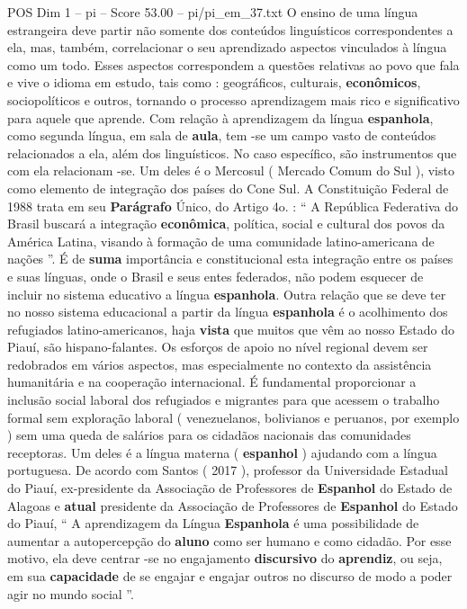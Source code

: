 \begin{textsample}{POS Dim 1 – pi – Score 53.00 – pi/pi\_em\_37.txt}
O ensino de uma língua estrangeira deve partir não somente dos conteúdos linguísticos correspondentes a ela, mas, também, correlacionar o seu aprendizado aspectos vinculados à língua como um todo.
Esses aspectos correspondem a questões relativas ao povo que fala e vive o idioma em estudo, tais como : geográficos, culturais, \textbf{econômicos}, sociopolíticos e outros, tornando o processo aprendizagem mais rico e significativo para aquele que aprende.
Com relação à aprendizagem da língua \textbf{espanhola}, como segunda língua, em sala de \textbf{aula}, tem -se um campo vasto de conteúdos relacionados a ela, além dos linguísticos.
No caso específico, são instrumentos que com ela relacionam -se.
Um deles é o Mercosul ( Mercado Comum do Sul ), visto como elemento de integração dos países do Cone Sul.
A Constituição Federal de 1988 trata em seu \textbf{Parágrafo} Único, do Artigo 4o. : “ A República Federativa do Brasil buscará a integração \textbf{econômica}, política, social e cultural dos povos da América Latina, visando à formação de uma comunidade latino-americana de nações ”.
É de \textbf{suma} importância e constitucional esta integração entre os países e suas línguas, onde o Brasil e seus entes federados, não podem esquecer de incluir no sistema educativo a língua \textbf{espanhola}.
Outra relação que se deve ter no nosso sistema educacional a partir da língua \textbf{espanhola} é o acolhimento dos refugiados latino-americanos, haja \textbf{vista} que muitos que vêm ao nosso Estado do Piauí, são hispano-falantes.
Os esforços de apoio no nível regional devem ser redobrados em vários aspectos, mas especialmente no contexto da assistência humanitária e na cooperação internacional.
É fundamental proporcionar a inclusão social laboral dos refugiados e migrantes para que acessem o trabalho formal sem exploração laboral ( venezuelanos, bolivianos e peruanos, por exemplo ) sem uma queda de salários para os cidadãos nacionais das comunidades receptoras.
Um deles é a língua materna ( \textbf{espanhol} ) ajudando com a língua portuguesa.
De acordo com Santos ( 2017 ), professor da Universidade Estadual do Piauí, ex-presidente da Associação de Professores de \textbf{Espanhol} do Estado de Alagoas e \textbf{atual} presidente da Associação de Professores de \textbf{Espanhol} do Estado do Piauí, “ A aprendizagem da Língua \textbf{Espanhola} é uma possibilidade de aumentar a autopercepção do \textbf{aluno} como ser humano e como cidadão.
Por esse motivo, ela deve centrar -se no engajamento \textbf{discursivo} do \textbf{aprendiz}, ou seja, em sua \textbf{capacidade} de se engajar e engajar outros no discurso de modo a poder agir no mundo social ”.

\end{textsample}
